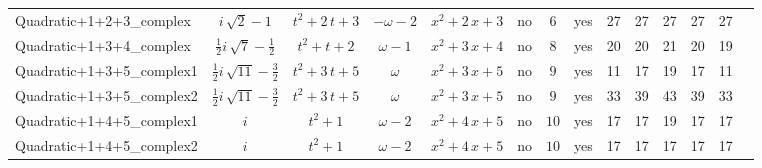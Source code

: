 \begin{tabular}{l|c c c c|ccc|c c  c  c  c  c  }
Quadratic+1+2+3\_complex & $ i \, \sqrt{2} - 1 $ & $ t^{2} + 2 \, t + 3 $ & $ -\omega - 2 $ & $ x^{2} + 2 \, x + 3 $ & no & $ 6 $ & yes & 27 & 27 & 27 & 27 & 27 \\
Quadratic+1+3+4\_complex & $ \frac{1}{2} i \, \sqrt{7} - \frac{1}{2} $ & $ t^{2} + t + 2 $ & $ \omega - 1 $ & $ x^{2} + 3 \, x + 4 $ & no & $ 8 $ & yes & 20 & 20 & 21 & 20 & 19 \\
Quadratic+1+3+5\_complex1 & $ \frac{1}{2} i \, \sqrt{11} - \frac{3}{2} $ & $ t^{2} + 3 \, t + 5 $ & $ \omega $ & $ x^{2} + 3 \, x + 5 $ & no & $ 9 $ & yes & 11 & 17 & 19 & 17 & 11 \\
Quadratic+1+3+5\_complex2  & $ \frac{1}{2} i \, \sqrt{11} - \frac{3}{2} $ & $ t^{2} + 3 \, t + 5 $ & $ \omega $ & $ x^{2} + 3 \, x + 5 $ & no & $ 9 $ & yes & 33 & 39 & 43 & 39 & 33 \\
Quadratic+1+4+5\_complex1 & $ i $ & $ t^{2} + 1 $ & $ \omega - 2 $ & $ x^{2} + 4 \, x + 5 $ & no & $ 10 $ & yes & 17 & 17 & 19 & 17 & 17 \\
Quadratic+1+4+5\_complex2 & $ i $ & $ t^{2} + 1 $ & $ \omega - 2 $ & $ x^{2} + 4 \, x + 5 $ & no & $ 10 $ & yes & 17 & 17 & 17 & 17 & 17 \\
\end{tabular}
